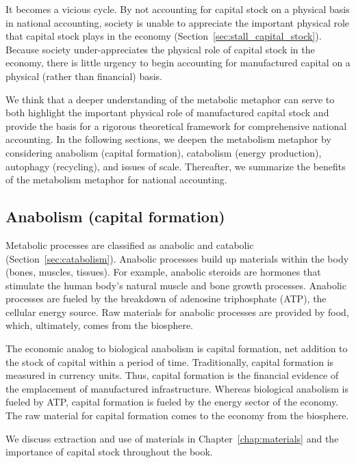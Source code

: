 It becomes a vicious cycle. 
By not accounting for capital stock on a physical basis 
in national accounting, 
society is unable to appreciate 
the important physical role that capital stock plays in the economy
(Section~\ref{sec:stall_capital_stock}).
Because society under-appreciates the physical role of capital stock in the economy, 
there is little urgency to begin accounting 
for manufactured capital on a physical (rather than financial) basis.

We think that a deeper understanding of the metabolic metaphor
can serve to both highlight the important physical role of manufactured capital stock and 
provide the basis for a rigorous theoretical framework 
for comprehensive national accounting.
In the following sections, 
we deepen the metabolism metaphor by considering 
anabolism (capital formation),
catabolism (energy production),
autophagy (recycling), and
issues of scale.
Thereafter, we summarize the benefits of the metabolism metaphor
for national accounting.

\subsection{Anabolism (capital formation)}
\label{sec:anabolism}

Metabolic processes are classified as anabolic and catabolic 
(Section~\ref{sec:catabolism}).
Anabolic processes build up materials within the body (bones, muscles, tissues).
For example, anabolic steroids are hormones that stimulate 
the human body's natural muscle and bone growth processes.
Anabolic processes are fueled by the breakdown 
of adenosine triphosphate (ATP), the cellular energy source.
Raw materials for anabolic processes are provided by food, 
which, ultimately, comes from the biosphere.

The economic analog to biological anabolism is capital formation, 
net addition to the stock of capital within a period of time.
Traditionally, capital formation is measured in currency units.
Thus, capital formation is the financial evidence 
of the emplacement of manufactured infrastructure.
Whereas biological anabolism is fueled by ATP, 
capital formation is fueled by the energy sector of the economy.
The raw material for capital formation comes to the 
economy from the biosphere.

We discuss extraction and use of materials in Chapter~\ref{chap:materials}
and the importance of capital stock throughout the book.


